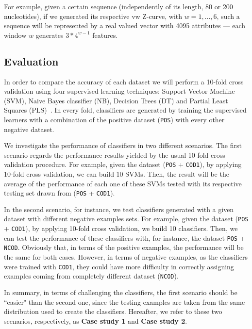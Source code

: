 \documentclass{sig-alternate}
\theoremstyle{plain}
\begin{document}
For example, given a certain sequence (independently of its length, 80 or 200 nucleotides), if we  generated its respective  vw Z-curve,  with $ w = 1, ..., 6 $, such a sequence will be represented by a real valued vector with 4095 attributes ---  each window $w$  generates $ 3*4^{w-1} $ features. 

\subsection{Evaluation}

In order to compare the accuracy of each dataset we will perform a 10-fold cross validation using four supervised learning techniques: Support Vector Machine (SVM), Naive Bayes classifier   (NB), Decision Trees (DT) and Partial Least Squares (PLS)~\cite{song2011a,mitchell1997}. In every fold, classifiers are generated by training the supervised learners with a combination of the positive dataset ({\tt POS}) with every other negative dataset.

We  investigate the performance of classifiers in two different scenarios. The first scenario regards the performance results  yielded by the usual 10-fold cross validation procedure. For example, given the dataset ({\tt POS} + {\tt COD1}), by applying 10-fold cross validation, we can build  10 SVMs. Then, the result will be the average of the performance of each one of these SVMs tested with its respective testing set drawn from ({\tt POS} + {\tt COD1}).

In the second scenario, for instance, we test classifiers generated with a given dataset with  different negative examples sets.   For example, given the dataset ({\tt POS} + {\tt COD1}), by applying 10-fold cross validation, we build  10 classifiers. Then, we can test the performance of these classifiers with, for instance, the dataset {\tt POS} + {\tt NCOD}. Obviously that, in terms of the  positive examples, the performance will be the same for both cases. However, in terms of negative examples, as the classifiers  were trained with {\tt COD1}, they could have more difficulty in correctly assigning examples coming from completely different dataset ({\tt NCOD}).

In summary, in terms of challenging the classifiers, the first scenario should  be ``easier"  than the second one, since the testing examples are taken from the same distribution used to create the classifiers. Hereafter, we refer to these two scenarios, respectively,  as {\bf Case study 1} and {\bf Case study 2}.
\end{document}
